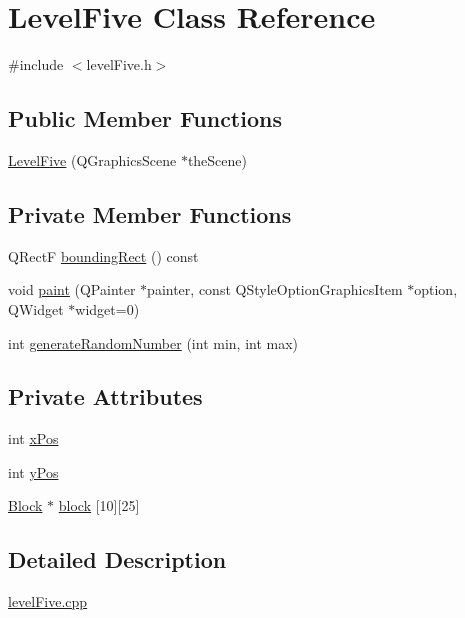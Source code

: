 \hypertarget{class_level_five}{
\section{LevelFive Class Reference}
\label{class_level_five}
}


{\ttfamily \#include $<$levelFive.h$>$}\subsection*{Public Member Functions}
\begin{DoxyCompactItemize}
\item 
\hyperlink{class_level_five_abbd9665cd046830beb552b2632d5c400}{LevelFive} (QGraphicsScene $\ast$theScene)
\end{DoxyCompactItemize}
\subsection*{Private Member Functions}
\begin{DoxyCompactItemize}
\item 
QRectF \hyperlink{class_level_five_ab9b179447ae7546beec7e7e9936e0178}{boundingRect} () const 
\item 
void \hyperlink{class_level_five_a128669075332c352f423e6e7892c9370}{paint} (QPainter $\ast$painter, const QStyleOptionGraphicsItem $\ast$option, QWidget $\ast$widget=0)
\item 
int \hyperlink{class_level_five_a15a3c882b6f2c4f645cd627e72cd7410}{generateRandomNumber} (int min, int max)
\end{DoxyCompactItemize}
\subsection*{Private Attributes}
\begin{DoxyCompactItemize}
\item 
int \hyperlink{class_level_five_a49d0735f7e21868c1c128bd682cb60e0}{xPos}
\item 
int \hyperlink{class_level_five_aef7da49944f2c0192e80f54c427a5db9}{yPos}
\item 
\hyperlink{class_block}{Block} $\ast$ \hyperlink{class_level_five_acb6899f56afdf5b54ee0b078114dccdb}{block} \mbox{[}10\mbox{]}\mbox{[}25\mbox{]}
\end{DoxyCompactItemize}


\subsection{Detailed Description}
\hyperlink{level_five_8cpp}{levelFive.cpp}

